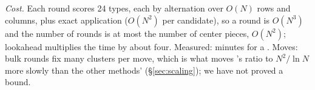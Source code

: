 \emph{Cost.} Each round scores 24 types, each by alternation over $O(N)$ rows and columns, plus exact application
($O(N^2)$ per candidate), so a round is $O(N^3)$ and the number of rounds is at most the number of center pieces,
$O(N^2)$; lookahead multiplies the time by about four. Measured: \FiveCTwentyMin{} minutes for a . Moves: bulk
rounds fix many clusters per move, which is what moves \FiveC's ratio to $N^2/\ln N$ more slowly than the other
methods' (\S\ref{sec:scaling}); we have not proved a bound.
